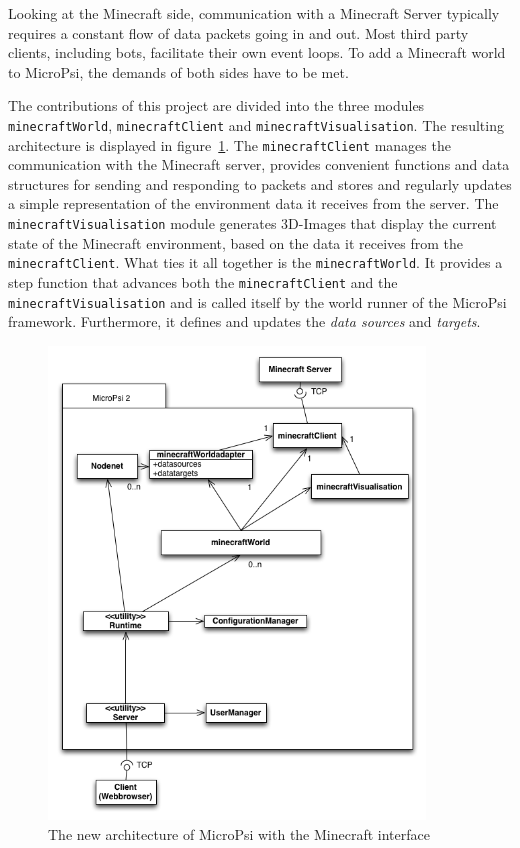 Looking at the Minecraft side, communication with a Minecraft Server typically requires a constant flow of data packets going in and out. Most third party clients, including bots, facilitate their own event loops. To add a Minecraft world to MicroPsi, the demands of both sides have to be met.


The contributions of this project are divided into the three modules \texttt{minecraftWorld}, \texttt{minecraftClient} and \texttt{minecraftVisualisation}. The resulting architecture is displayed in figure~\ref{uml_mc}. The \texttt{minecraftClient} manages the communication with the Minecraft server, provides convenient functions and data structures for sending and responding to packets and stores and regularly updates a simple representation of the environment data it receives from the server. The \texttt{minecraftVisualisation} module generates 3D-Images that display the current state of the Minecraft environment, based on the data it receives from the \texttt{minecraftClient}. What ties it all together is the \texttt{minecraftWorld}. It provides a step function that advances both the \texttt{minecraftClient} and the \texttt{minecraftVisualisation} and is called itself by the world runner of the MicroPsi framework. Furthermore, it defines and updates the \emph{data sources} and \emph{targets}.



\begin{figure}[h]
  \centering
    \includegraphics[width=10cm]{graphics/UML_MicroPsi_mit_spock_v12}
  \caption{The new architecture of MicroPsi with the Minecraft interface}
  \label{uml_mc}
\end{figure}

